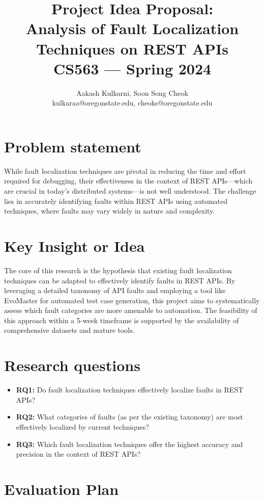 \documentclass[12pt, letterpaper]{article}
\title{\textbf{ Project Idea Proposal:\\ Analysis of Fault Localization Techniques on REST APIs
\\ CS563 --- Spring 2024}}
\author{Aakash Kulkarni, Soon Song Cheok
\\ kulkaraa@oregonstate.edu, cheoks@oregonstate.edu
}
\begin{document}
\maketitle

\section{Problem statement}
    While fault localization techniques are pivotal in reducing the time and effort required for debugging, their effectiveness in the context of REST APIs—which are crucial in today's distributed systems—is not well understood. The challenge lies in accurately identifying faults within REST APIs using automated techniques, where faults may vary widely in nature and complexity.
    


\section{Key Insight or Idea}
    The core of this research is the hypothesis that existing fault localization techniques can be adapted to effectively identify faults in REST APIs. By leveraging a detailed taxonomy of API faults and employing a tool like EvoMaster for automated test case generation, this project aims to systematically assess which fault categories are more amenable to automation. The feasibility of this approach within a 5-week timeframe is supported by the availability of comprehensive datasets and mature tools.
    


\section{Research questions}
    \begin{itemize}
        \item \textbf{RQ1:} Do fault localization techniques effectively localize faults in REST APIs?
        \item \textbf{RQ2:} What categories of faults (as per the existing taxonomy) are most effectively localized by current techniques?
        \item \textbf{RQ3:} Which fault localization techniques offer the highest accuracy and precision in the context of REST APIs?
    \end{itemize}
    

\section{Evaluation Plan}
\end{document}
